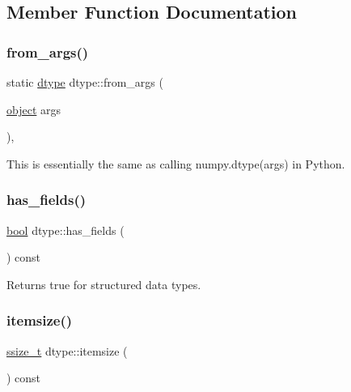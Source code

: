 \subsection{Member Function Documentation}
\mbox{\label{classdtype_ac32ee9257455ed7879d124fb225b0baa}} 
\subsubsection{\texorpdfstring{from\_args()}{from\_args()}}
{\footnotesize\ttfamily static \mbox{\hyperlink{classdtype}{dtype}} dtype\+::from\+\_\+args (\begin{DoxyParamCaption}\item[{\mbox{\hyperlink{classobject}{object}}}]{args }\end{DoxyParamCaption})\hspace{0.3cm}{\ttfamily [inline]}, {\ttfamily [static]}}



This is essentially the same as calling numpy.\+dtype(args) in Python. 

\mbox{\label{classdtype_ac5eef3474b98106df8be32c6aaa3106b}} 
\subsubsection{\texorpdfstring{has\_fields()}{has\_fields()}}
{\footnotesize\ttfamily \mbox{\hyperlink{asdl_8h_af6a258d8f3ee5206d682d799316314b1}{bool}} dtype\+::has\+\_\+fields (\begin{DoxyParamCaption}{ }\end{DoxyParamCaption}) const\hspace{0.3cm}{\ttfamily [inline]}}



Returns true for structured data types. 

\mbox{\label{classdtype_a7560e2e9cd37d8dd697755e58442e4cb}} 
\subsubsection{\texorpdfstring{itemsize()}{itemsize()}}
{\footnotesize\ttfamily \mbox{\hyperlink{detail_2common_8h_ac430d16fc097b3bf0a7469cfd09decda}{ssize\+\_\+t}} dtype\+::itemsize (\begin{DoxyParamCaption}{ }\end{DoxyParamCaption}) const\hspace{0.3cm}{\ttfamily [inline]}}



